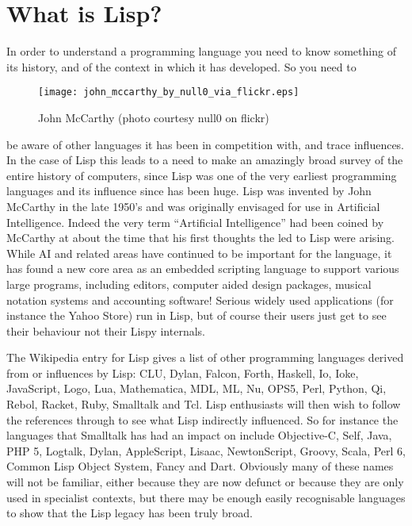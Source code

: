\chapter{What is Lisp?}
In order to understand a programming language you need to know something of
its history, and of the context in which it has developed. So you need to
\begin{wrapfigure}{l}{2.5in}
{\centering
\texttt{[image: john\_mccarthy\_by\_null0\_via\_flickr.eps]}}
\caption{John McCarthy (photo courtesy null0 on flickr)}
\end{wrapfigure} be aware of other languages it has been in competition with, and trace
influences. In the case of Lisp this leads to a need to make an amazingly
broad survey of the entire history of computers, since Lisp was one of the
very earliest programming languages and its influence since has been huge.
Lisp was invented by John McCarthy in the late 1950's
and was originally envisaged for use in Artificial Intelligence. Indeed the very
term ``Artificial Intelligence'' had been coined by McCarthy at about the
time that his first thoughts the led to Lisp were arising. While AI and
related areas have continued to be important for the language, it has
found a new core area as an embedded scripting language to support
various large programs, including editors, computer aided design packages,
musical notation systems and accounting software! Serious widely used
applications (for instance the Yahoo Store) run in Lisp, but of course
their users just get to see their behaviour not their Lispy internals.

The Wikipedia entry for Lisp gives a list of other programming languages
derived from or influences by Lisp: CLU, Dylan, Falcon, Forth, Haskell,
Io, Ioke, JavaScript, Logo, Lua, Mathematica, MDL, ML, Nu, OPS5, Perl,
Python, Qi, Rebol, Racket, Ruby, Smalltalk and Tcl. Lisp enthusiasts will
then wish to follow the references through to see what Lisp indirectly
influenced. So for instance the languages that Smalltalk has had an
impact on include Objective-C, Self, Java, PHP 5, Logtalk, Dylan,
AppleScript, Lisaac, NewtonScript, Groovy, Scala, Perl 6,
Common Lisp Object System, Fancy and Dart. Obviously many of these names
will not be familiar, either because they are now defunct or because they
are only used in specialist contexts, but there may be enough
easily recognisable languages to show that the Lisp legacy has been
truly broad.

